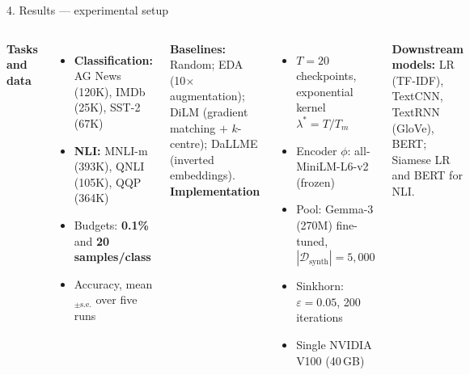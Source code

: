 \documentclass[aspectratio=169,11pt]{beamer}
\newcommand{\Dsyn}{\mathcal{D}_\text{synth}}
\begin{document}
\begin{frame}{4. Results --- experimental setup}
  \begin{columns}[T,onlytextwidth]
      \textbf{Tasks and data}\par\medskip
      \begin{itemize}
        \item \textbf{Classification:} AG News (120K), IMDb (25K), SST-2 (67K)
        \item \textbf{NLI:} MNLI-m (393K), QNLI (105K), QQP (364K)
        \item Budgets: \textbf{0.1\%} and \textbf{20 samples/class}
        \item Accuracy, mean$_{\pm\text{s.e.}}$ over five runs
      \end{itemize}
      \medskip
      \textbf{Baselines:} Random; EDA (10$\times$ augmentation); DiLM (gradient matching $+$ $k$-centre); DaLLME (inverted embeddings).
      \textbf{Implementation}\par\medskip
      \begin{itemize}
        \item $T = 20$ checkpoints, exponential kernel $\lambda^* = T/T_m$
        \item Encoder $\phi$: all-MiniLM-L6-v2 (frozen)
        \item Pool: Gemma-3 (270M) fine-tuned, $|\Dsyn| = 5{,}000$
        \item Sinkhorn: $\varepsilon = 0.05$, 200 iterations
        \item Single NVIDIA V100 (40\,GB)
      \end{itemize}
      \medskip
      \textbf{Downstream models:} LR (TF-IDF), TextCNN, TextRNN (GloVe), BERT; Siamese LR and BERT for NLI.
  \end{columns}
\end{frame}
\end{document}
